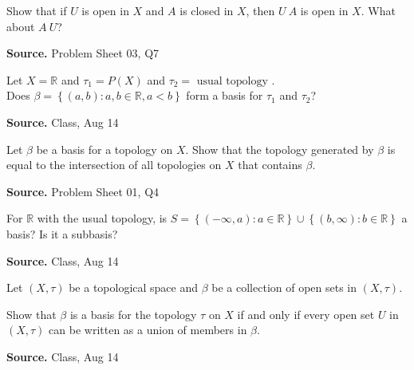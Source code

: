 \documentclass[12pt,twoside]{report}
\newenvironment*{source}{\hfill\scriptsize\textbf{Source.}\space}{\par}
\begin{document}
\begin{samepage}
\begin{ex}
Show that if $U$ is open in $X$ and $A$ is closed in $X$, then $U \ A$ is open in $X$. What about $A \ U$?
\end{ex}
\begin{source}
Problem Sheet 03, Q7
\end{source}
\end{samepage}

\begin{samepage}
\begin{ex}
    Let $X = \mathbb{R}$ and $\tau_1 = P\left (X\right )$ and $\tau_2 = \text{ usual topology }$. \\
    Does $\beta = \left\{ \left (a,b\right )  :  a,b \in \mathbb{R}, a < b \right\}$ form a basis for $\tau_1$ and $\tau_2$?
\end{ex}
\begin{source}
    Class, Aug 14
\end{source}
\end{samepage}

\begin{samepage}
\begin{ex}
    Let $\beta$ be a basis for a topology on $X$. Show that the topology generated by $\beta$ is equal to the intersection of all topologies on $X$ that contains $\beta$.
\end{ex}
\begin{source}
Problem Sheet 01, Q4
\end{source}
\end{samepage}

\begin{samepage}
\begin{ex}
    For $\mathbb{R}$ with the usual topology, is $S = \left\{ \left (- \infty, a\right )  :  a \in \mathbb{R} \right\} \cup \left\{ \left (b, \infty\right )  :  b \in \mathbb{R} \right\}$ a basis? Is it a subbasis?
\end{ex}
\begin{source}
Class, Aug 14
\end{source}
\end{samepage}

\begin{samepage}
\begin{ex}
Let $\left (X, \tau\right )$ be a topological space and $\beta$ be a collection of open sets in $\left (X, \tau\right )$. 

Show that $\beta$ is a basis for the topology $\tau$ on $X$ if and only if every open set $U$ in $\left (X, \tau\right )$ can be written as a union of members in $\beta$.
\end{ex}
\begin{source}
Class, Aug 14
\end{source}
\end{samepage}
\end{document}
